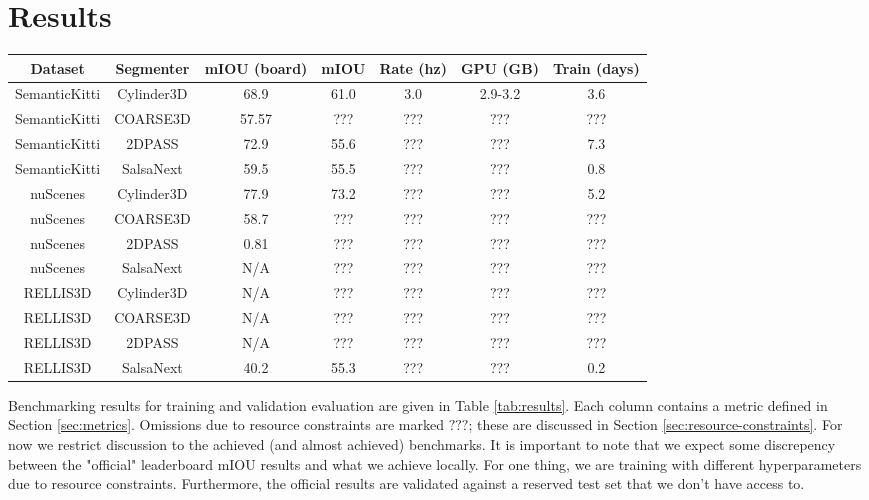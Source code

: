 \section{Results}
\label{chap:results}

\begin{center}
\begin{tabular}{ |c|c|c|c|c|c|c| }
 \hline
 Dataset & Segmenter & mIOU (board) & mIOU & Rate (hz) & GPU (GB) & Train (days) \\
 \hline
  SemanticKitti & Cylinder3D & 68.9 \cite{semantickittileaderboard} & 61.0 & 3.0 & 2.9-3.2 & 3.6 \\
  SemanticKitti & COARSE3D & 57.57 \cite{coarse3dgithub} & ???  & ??? & ??? & ??? \\
  SemanticKitti & 2DPASS & 72.9 \cite{semantickittileaderboard} & 55.6  & ??? & ??? & 7.3 \\
  SemanticKitti & SalsaNext & 59.5 \cite{semantickittileaderboard} & 55.5  & ??? & ??? & 0.8 \\
  nuScenes & Cylinder3D & 77.9 \cite{cylinder3dgithub} & 73.2 & ??? & ??? & 5.2 \\
  nuScenes & COARSE3D & 58.7 \cite{coarse3dgithub} & ??? & ??? &  ??? & ??? \\
  nuScenes & 2DPASS & 0.81 \cite{nuscenesleaderboard} & ??? & ??? &  ??? & ??? \\
  nuScenes & SalsaNext & N/A & ??? &  ??? & ??? & ??? \\
  RELLIS3D & Cylinder3D & N/A & ??? &  ??? & ??? & ??? \\
  RELLIS3D & COARSE3D & N/A & ??? &  ??? & ??? & ??? \\
  RELLIS3D & 2DPASS & N/A & ??? & ??? & ??? & ??? \\
  RELLIS3D & SalsaNext & 40.2 \cite{rellis3dgithub} & 55.3 &  ??? & ??? & 0.2 \\
 \hline
\end{tabular}
\label{tab:results}
\end{center}

Benchmarking results for training and validation evaluation are given in Table \ref{tab:results}. Each column contains a metric defined in Section \ref{sec:metrics}. Omissions due to resource constraints are marked $???$; these are discussed in Section \ref{sec:resource-constraints}. For now we restrict discussion to the achieved (and almost achieved) benchmarks. It is important to note that we expect some discrepency between the "official" leaderboard mIOU results and what we achieve locally. For one thing, we are training with different hyperparameters due to resource constraints. Furthermore, the official results are validated against a reserved test set that we don't have access to.


